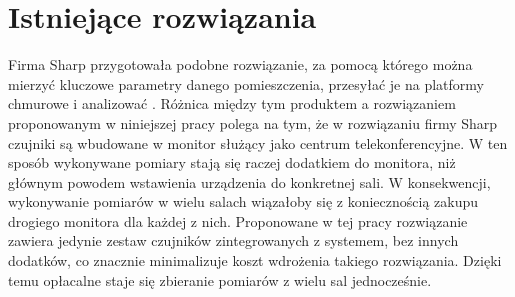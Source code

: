 \newpage
\section{Istniejące rozwiązania}
Firma Sharp przygotowała podobne rozwiązanie, za pomocą którego można mierzyć kluczowe 
parametry danego pomieszczenia, przesyłać je na platformy chmurowe i analizować 
\cite{sharp2022}. Różnica między tym produktem a rozwiązaniem proponowanym w niniejszej pracy 
polega na tym, że w rozwiązaniu firmy Sharp czujniki są wbudowane w monitor służący 
jako centrum telekonferencyjne. W ten sposób wykonywane pomiary stają się raczej 
dodatkiem do monitora, niż głównym powodem wstawienia urządzenia do konkretnej sali. 
W konsekwencji, wykonywanie pomiarów w wielu salach wiązałoby się z koniecznością 
zakupu drogiego monitora dla każdej z nich. Proponowane w tej pracy rozwiązanie zawiera 
jedynie zestaw czujników zintegrowanych z systemem, bez innych dodatków, co 
znacznie minimalizuje koszt wdrożenia takiego rozwiązania. Dzięki temu opłacalne staje
się zbieranie pomiarów z wielu sal jednocześnie.